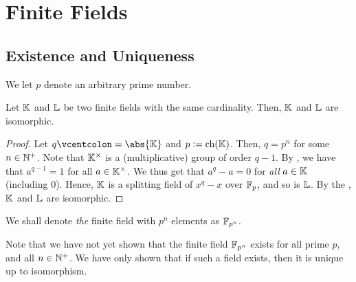 \section{Finite Fields}

\subsection{Existence and Uniqueness}

We let $p$ denote an arbitrary prime number.

\begin{theorem} \label{thm:finite-field-uniqueness}
    Let $\mathbb{K}$ and $\mathbb{L}$ be two finite fields with the same cardinality. Then, $\mathbb{K}$ and $\mathbb{L}$ are isomorphic.
\end{theorem}
\begin{proof}
    Let $q \vcentcolon= \abs{\K}$ and $p \vcentcolon= \operatorname{ch}(\mathbb{K})$. Then, $q = p^n$ for some $n \in \mathbb{N}^+$. Note that $\mathbb{K}^{\times}$ is a (multiplicative) group of order $q-1$. By , we have that $a^{q-1} = 1$ for all $a \in \mathbb{K}^{\times}$. We thus get that $a^q - a = 0$ for \emph{all} $a \in \mathbb{K}$ (including $0$). Hence, $\mathbb{K}$ is a splitting field of $x^q - x$ over $\mathbb{F}_p$, and so is $\mathbb{L}$. By the , $\mathbb{K}$ and $\mathbb{L}$ are isomorphic.
\end{proof}

\begin{defn}
    We shall denote \emph{the} finite field with $p^n$ elements as $\mathbb{F}_{p^n}$.
\end{defn}

\begin{rem}
    Note that we have not yet shown that the finite field $\mathbb{F}_{p^n}$ exists for all prime $p$, and all $n \in \mathbb{N}^+$. We have only shown that if such a field exists, then it is unique up to isomorphism.
\end{rem}

